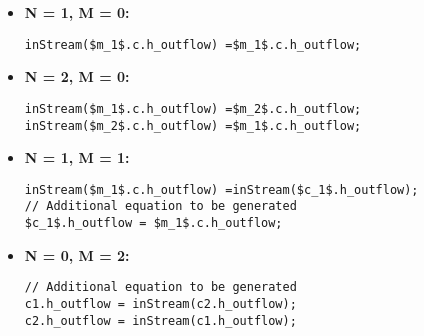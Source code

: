 \begin{itemize}
\raggedright
\item \textbf{N = 1, M = 0:}\newline
\begin{lstlisting}[language=modelica,mathescape=true]
inStream($m_1$.c.h_outflow) =$m_1$.c.h_outflow;
\end{lstlisting}
\item
\textbf{N = 2, M = 0:}\newline
\begin{lstlisting}[language=modelica,mathescape=true]
inStream($m_1$.c.h_outflow) =$m_2$.c.h_outflow;
inStream($m_2$.c.h_outflow) =$m_1$.c.h_outflow;
\end{lstlisting}
\item \textbf{N = 1, M = 1:}\newline
\begin{lstlisting}[language=modelica,mathescape=true]
inStream($m_1$.c.h_outflow) =inStream($c_1$.h_outflow);
// Additional equation to be generated
$c_1$.h_outflow = $m_1$.c.h_outflow;
\end{lstlisting}
\item \textbf{N = 0, M = 2:}\newline
\begin{lstlisting}[language=modelica,mathescape=true]
// Additional equation to be generated
c1.h_outflow = inStream(c2.h_outflow);
c2.h_outflow = inStream(c1.h_outflow);
\end{lstlisting}


\end{itemize}
